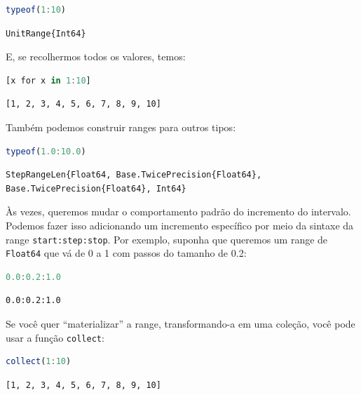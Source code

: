 \documentclass[
  notoc %
]{tufte-book}
\newcommand{\passthrough}[1]{#1}
\begin{document}
\begin{lstlisting}[language=Julia]
typeof(1:10)
\end{lstlisting}

\begin{lstlisting}[language=Output]
UnitRange{Int64}
\end{lstlisting}

E, se recolhermos todos os valores, temos:

\begin{lstlisting}[language=Julia]
[x for x in 1:10]
\end{lstlisting}

\begin{lstlisting}[language=Output]
[1, 2, 3, 4, 5, 6, 7, 8, 9, 10]
\end{lstlisting}

Também podemos construir ranges para outros tipos:

\begin{lstlisting}[language=Julia]
typeof(1.0:10.0)
\end{lstlisting}

\begin{lstlisting}[language=Output]
StepRangeLen{Float64, Base.TwicePrecision{Float64}, Base.TwicePrecision{Float64}, Int64}
\end{lstlisting}

Às vezes, queremos mudar o comportamento padrão do incremento do
intervalo. Podemos fazer isso adicionando um incremento específico por
meio da sintaxe da range \passthrough{\lstinline!start:step:stop!}. Por
exemplo, suponha que queremos um range de
\passthrough{\lstinline!Float64!} que vá de 0 a 1 com passos do tamanho
de 0.2:

\begin{lstlisting}[language=Julia]
0.0:0.2:1.0
\end{lstlisting}

\begin{lstlisting}[language=Output]
0.0:0.2:1.0
\end{lstlisting}

Se você quer ``materializar'' a range, transformando-a em uma coleção,
você pode usar a função \passthrough{\lstinline!collect!}:

\begin{lstlisting}[language=Julia]
collect(1:10)
\end{lstlisting}

\begin{lstlisting}[language=Output]
[1, 2, 3, 4, 5, 6, 7, 8, 9, 10]
\end{lstlisting}
\end{document}
